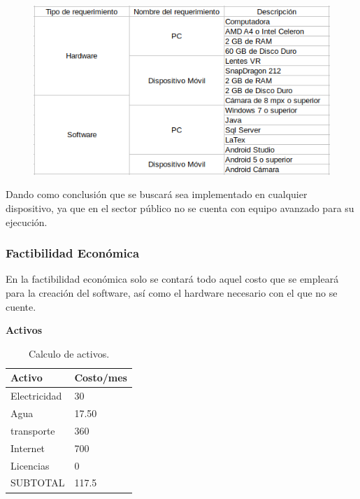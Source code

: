 \documentclass[10pt]{article}
\begin{document}
\begin{figure}[H]
	\begin{center}
\includegraphics[scale = 0.80]{Imagenes/tabla.png}
	\end{center} 
\end{figure}

Dando como conclusión que se buscará sea implementado en cualquier dispositivo, ya que en el sector público no se cuenta con equipo avanzado para su ejecución.

\subsubsection{Factibilidad Económica}

En la factibilidad económica solo se contará todo aquel costo que se empleará para la creación del software, así como el hardware necesario con el que no se cuente.

\textbf{Activos}

\begin{table}[htbp]
\begin{center}
\begin{tabular}{|p{4.2cm}|p{4.2cm}|}
\hline
Activo & Costo/mes  \\
\hline
Electricidad &  30 \\
\hline
Agua &  17.50 \\
\hline
transporte &  360 \\
\hline
Internet & 700\\
\hline
Licencias & 0\\
\hline
SUBTOTAL & 117.5\\
\hline
\end{tabular}
\caption{Calculo de activos.}
\label{tabla1}
\end{center}
\end{table}
\end{document}
